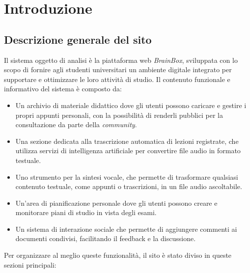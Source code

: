 \section{Introduzione}

\subsection{Descrizione generale del sito}

Il sistema oggetto di analisi è la piattaforma web \textit{BrainBox}, sviluppata con lo scopo di fornire agli studenti universitari un ambiente digitale integrato per supportare e ottimizzare le loro attività di studio. Il contenuto funzionale e informativo del sistema è composto da:

\begin{itemize}
    \item Un archivio di materiale didattico dove gli utenti possono caricare e gestire i propri appunti personali, con la possibilità di renderli pubblici per la consultazione da parte della \textit{community}.
    
    \item Una sezione dedicata alla trascrizione automatica di lezioni registrate, che utilizza servizi di intelligenza artificiale per convertire file audio in formato testuale.
    
    \item Uno strumento per la sintesi vocale, che permette di trasformare qualsiasi contenuto testuale, come appunti o trascrizioni, in un file audio ascoltabile.
    
    \item Un'area di pianificazione personale dove gli utenti possono creare e monitorare piani di studio in vista degli esami.
    
    \item Un sistema di interazione sociale che permette di aggiungere commenti ai documenti condivisi, facilitando il feedback e la discussione.
\end{itemize}

Per organizzare al meglio queste funzionalità, il sito è stato diviso in queste sezioni principali:

